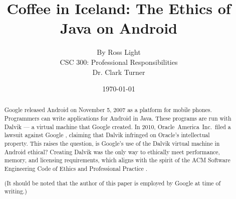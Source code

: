 \documentclass[11pt]{article}
\begin{document}
\title{\vfill Coffee in Iceland: The Ethics of Java on Android} %
\author{
By Ross Light \vspace{10pt} \\
CSC 300: Professional Responsibilities  \vspace{10pt} \\
Dr. Clark Turner \vspace{10pt} \\
}
\date{\today} %

\maketitle

\vfill  %
\begin{abstract} %

Google released Android on November 5, 2007 \cite{open-handset-alliance-ann} as
a platform for mobile phones. Programmers can write applications for Android in
Java.  These programs are run with Dalvik --- a virtual machine that Google
created.  In 2010, Oracle~America~Inc.\ filed a lawsuit against Google
\cite{oracle-lawsuit}, claiming that Dalvik infringed on Oracle's intellectual
property.  This raises the question, is Google's use of the Dalvik virtual
machine in Android ethical?  Creating Dalvik was the only way to ethically meet
performance, memory, and licensing requirements, which aligns with the spirit of
the ACM Software Engineering Code of Ethics and Professional Practice
\cite{secode}.

(It should be noted that the author of this paper is employed by Google at time
of writing.)

\end{abstract} %

\thispagestyle{empty} %
\newpage

\thispagestyle{empty}  %
\tableofcontents

\newpage
\end{document}
